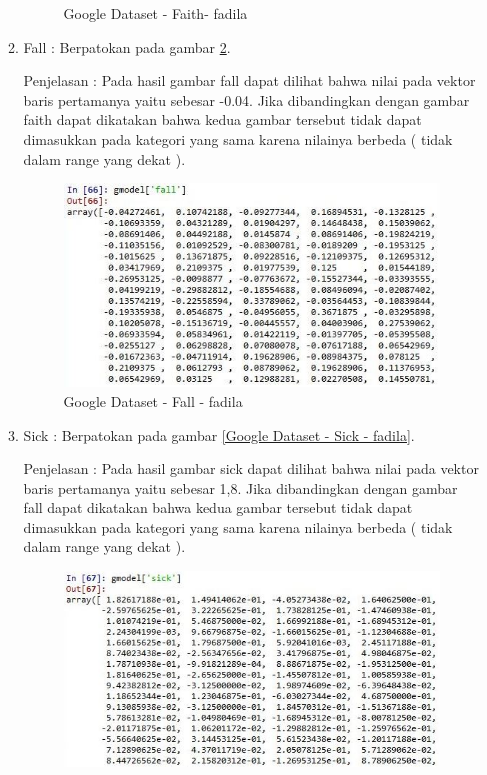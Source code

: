 \begin{enumerate}
\begin{enumerate}
\begin{figure}[!hbtp]
\caption{Google Dataset - Faith- fadila}
\label{Google Dataset - Faith- fadila}
\end{figure}
\par
\item Fall :  Berpatokan pada gambar \ref{Google Dataset - Fall - fadila}.
\par Penjelasan : Pada hasil gambar fall dapat dilihat bahwa nilai pada vektor baris pertamanya yaitu sebesar -0.04. Jika dibandingkan dengan gambar faith dapat dikatakan bahwa kedua gambar tersebut tidak dapat dimasukkan pada kategori yang sama karena nilainya berbeda ( tidak dalam range yang dekat ).
\par
\begin{figure}[!hbtp]
\centering
\includegraphics[scale=0.3]{figures/1-fall-fadila.jpg}
\caption{Google Dataset - Fall - fadila}
\label{Google Dataset - Fall - fadila}
\end{figure}
\par
\item Sick :  Berpatokan pada gambar \ref{Google Dataset - Sick - fadila}.
\par Penjelasan : Pada hasil gambar sick dapat dilihat bahwa nilai pada vektor baris pertamanya yaitu sebesar 1,8. Jika dibandingkan dengan gambar fall dapat dikatakan bahwa kedua gambar tersebut tidak dapat dimasukkan pada kategori yang sama karena nilainya berbeda ( tidak dalam range yang dekat ).
\par
\begin{figure}[!hbtp]
\centering
\includegraphics[scale=0.3]{figures/1-sick-fadila.jpg}

\end{figure}
\end{enumerate}
\end{enumerate}

